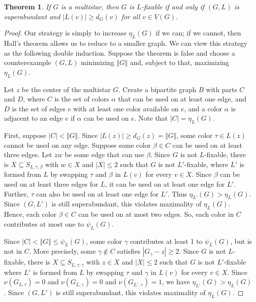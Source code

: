 \documentclass[12pt]{article}
\theoremstyle{plain}
\newtheorem{thm}{Theorem}[section]
\theoremstyle{definition}
\theoremstyle{remark}
\newcommand{\setb}[3]{\left\{ #1 \in #2 \mid #3 \right\}}
\newcommand{\size}[1]{\left\Vert#1\right\Vert}
\newcommand{\DefinedAs}{\mathrel{\mathop:}=}
\newcommand{\pot}{\operatorname{pot}}
\begin{document}
\begin{thm}\label{FixabilityOfStars}
If $G$ is a multistar, then $G$ is $L$-fixable if and only if $(G, L)$ is
superabundant and $|L(v)| \ge d_G(v)$ for all $v \in V(G)$.
\end{thm}
\begin{proof}
Our strategy is simply to increase $\eta_L(G)$ if we can; if we cannot, then
Hall's theorem allows us to reduce to a smaller graph.  We can view
this strategy as the following double induction. Suppose the theorem is
false and choose a counterexample $(G, L)$ minimizing $\size{G}$ and, subject to
that, maximizing $\eta_L(G)$.  
	
Let $z$ be the center of the multistar $G$. Create a bipartite graph $B$ with
parts $C$ and $D$, where $C$
is the set of colors $\alpha$ that can be used on at least one edge, and $D$ is
the set of edges $e$ with at least one color available on $e$, and a color
$\alpha$ is adjacent to an edge $e$ if $\alpha$ can be used on $e$.
Note that $|C|=\eta_L(G)$.
	
First, suppose $|C| < \size{G}$.  Since $|L(z)| \ge d_G(z) = \size{G}$, 
some color $\tau \in L(z)$ cannot be used on any edge.  Suppose some
color $\beta \in C$ can be used on at least three edges.  
Let $zw$ be some edge that can use $\beta$.
Since $G$ is not $L$-fixable, there is $X \subseteq S_{L, \tau, \beta}$ with
$w \in X$ and $|X| \le 2$ such that $G$ is not $L'$-fixable, where $L'$ is formed
from $L$ by swapping $\tau$ and $\beta$ in $L(v)$ for every $v \in X$.  Since
$\beta$ can be used on at least three edges for $L$, it can be used on at
least one edge for $L'$.  Further, $\tau$ can also be used on at least one edge
for $L'$.  Thus $\eta_{L'}(G) > \eta_L(G)$.  Since $(G,L')$ is still
superabundant, this violates maximality of $\eta_L(G)$.  Hence, 
each color $\beta \in C$ can be used on at most two edges.  So, each color in $C$
contributes at most one to $\psi_L(G)$.  

Since $|C| < \size{G} \le \psi_L(G)$,
some color $\gamma$ contributes at least 1 to $\psi_L(G)$, but is not in $C$.
More precisely, some $\gamma \not \in C$ satisfies $|G_\gamma - z| \ge 2$.  Since $G$
is not $L$-fixable, there is $X \subseteq S_{L, \tau, \gamma}$ with $z \in X$ and 
$|X| \le 2$ such that $G$ is not $L'$-fixable where $L'$ is formed from $L$
by swapping $\tau$ and $\gamma$ in $L(v)$ for every $v \in X$.  Since
$\nu(G_{L, \tau}) = 0$ and $\nu(G_{L, \gamma}) = 0$ and $\nu(G_{L', \gamma}) =
1$, we have $\eta_{L'}(G) > \eta_L(G)$. Since $(G,L')$ is still superabundant,
this violates maximality of $\eta_L(G)$.  


\end{proof}
\end{document}
